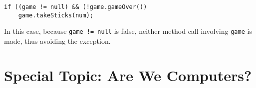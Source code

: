 \begin{jjjlisting}
\begin{lstlisting}
if ((game != null) && (!game.gameOver())
    game.takeSticks(num);
\end{lstlisting}
\end{jjjlisting}

\noindent In this case, because {\tt game != null} is false,
neither method call involving {\tt game} is made, thus avoiding the
exception.





\section*{{\color{cyan}Special Topic:} Are We Computers?}

